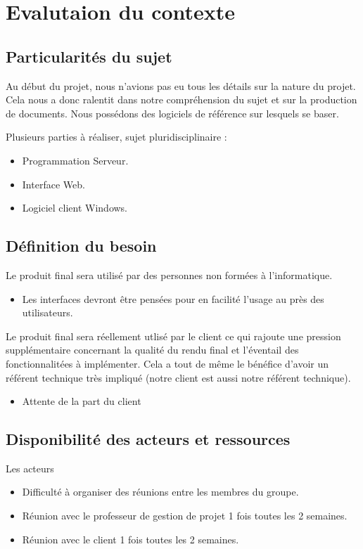 \chapter{Evalutaion du contexte}

\section{Particularités du sujet}
Au début du projet, nous n'avions pas eu tous les détails sur la nature du projet. Cela nous a donc ralentit
dans notre compréhension du sujet et sur la production de documents.
Nous possédons des logiciels de référence sur lesquels se baser.\\ \newline

Plusieurs parties à réaliser, sujet pluridisciplinaire :
\begin{itemize}
	\item Programmation Serveur.
	\item Interface Web.
	\item Logiciel client Windows.
\end{itemize}

\section{Définition du besoin}
Le produit final sera utilisé par des personnes non formées à l'informatique. 
\begin{itemize}	
	\item Les interfaces devront être pensées pour en facilité l'usage au près des utilisateurs.\newline
\end{itemize}

Le produit final sera réellement utlisé par le client ce qui rajoute une pression supplémentaire concernant la qualité du rendu final et l'éventail des fonctionnalitées à implémenter. Cela a tout de même le bénéfice d'avoir un référent technique très impliqué (notre client est aussi notre référent technique).
\begin{itemize}
	\item Attente de la part du client
\end{itemize}

\section{Disponibilité des acteurs et ressources}
Les acteurs
\begin{itemize}
	\item Difficulté à organiser des réunions entre les membres du groupe.
	\item Réunion avec le professeur de gestion de projet 1 fois toutes les 2 semaines. 
	\item Réunion avec le client 1 fois toutes les 2 semaines.\newline
\end{itemize}

